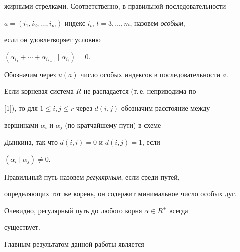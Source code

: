 жирными стрелками. Соответственно, в правильной последовательности


$a=(i_1,i_2,\dotsc,i_m)$ индекс $i_t$, $t=3,\dotsc,m$, назовем {\it особым},


если он удовлетворяет условию


$(\alpha_{i_1}+\dotsb +\alpha_{i_{t-1}}\mid \alpha_{i_t})=0$.


Обозначим через $u(a)$ число особых индексов в последовательности $a$.





Если корневая система $R$ не распадается (т.\,е. неприводима по


[1]), то для $1\le i,j\le r$ через $d(i,j)$ обозначим расстояние между


вершинами $\alpha_i$ и $\alpha_j$ (по кратчайшему пути) в схеме


Дынкина, так что $d(i,i)=0$ и $d(i,j)=1$, если


$(\alpha_i\mid\alpha_j)\ne 0$.





Правильный путь назовем {\it регулярным}, если среди путей,


определяющих тот же корень, он содержит минимальное число особых дуг.


Очевидно, регулярный путь до любого корня $\alpha \in R^+$ всегда


существует.





Главным результатом данной работы является





